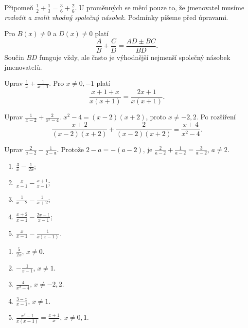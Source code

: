 \documentclass[11pt,a4paper]{article}
\begin{document}
Připomeň $\frac12+\frac13=\frac36+\frac26$. U proměnných se mění pouze to, že jmenovatel musíme \emph{rozložit a zvolit vhodný společný násobek}. Podmínky píšeme před úpravami.
\begin{zadaniBox}[title={Věta - Společný jmenovatel lomených výrazů}]
Pro $B(x)\ne0$ a $D(x)\ne0$ platí
\[\frac{A}{B}\pm\frac{C}{D}=\frac{AD\pm BC}{BD}.\]
Součin $BD$ funguje vždy, ale často je výhodnější nejmenší společný násobek jmenovatelů.
\end{zadaniBox}
\begin{prikladReseniBox}[breakable=false,title={Příklad 1}]
Uprav $\displaystyle\frac1x+\frac1{x+1}$.
\tcblower
Pro $x\ne0,-1$ platí
\[\frac{x+1+x}{x(x+1)}=\frac{2x+1}{x(x+1)}.\]
\end{prikladReseniBox}
\begin{prikladReseniBox}[breakable=false,title={Příklad 2}]
Uprav $\displaystyle\frac1{x-2}+\frac2{x^2-4}$.
\tcblower
$x^2-4=(x-2)(x+2)$, proto $x\ne-2,2$. Po rozšíření
\[\frac{x+2}{(x-2)(x+2)}+\frac2{(x-2)(x+2)}=\frac{x+4}{x^2-4}.\]
\end{prikladReseniBox}
\begin{prikladReseniBox}[breakable=false,title={Příklad 3}]
Uprav $\displaystyle\frac2{a-2}-\frac1{2-a}$.
\tcblower
Protože $2-a=-(a-2)$, je $\frac2{a-2}+\frac1{a-2}=\frac3{a-2}$, $a\ne2$.
\end{prikladReseniBox}
\begin{zadaniReseniBox}[breakable=false,title={Samostatná práce 1}]
\begin{enumerate}[label=\alph*)]
\item $\frac3x-\frac1{2x}$;
\item $\frac{x}{x-1}-\frac{x+1}{x-1}$;
\item $\frac1{x-2}-\frac1{x+2}$;
\item $\frac{x+2}{x-1}-\frac{2x-1}{x-1}$;
\item $\frac{x}{x-1}-\frac1{x(x-1)}$.
\end{enumerate}
\tcblower
\begin{enumerate}[label=\alph*)]
\item $\frac5{2x}$, $x\ne0$.
\item $-\frac1{x-1}$, $x\ne1$.
\item $\frac4{x^2-4}$, $x\ne-2,2$.
\item $\frac{3-x}{x-1}$, $x\ne1$.
\item $\frac{x^2-1}{x(x-1)}=\frac{x+1}{x}$, $x\ne0,1$.
\end{enumerate}
\end{zadaniReseniBox}
\end{document}
